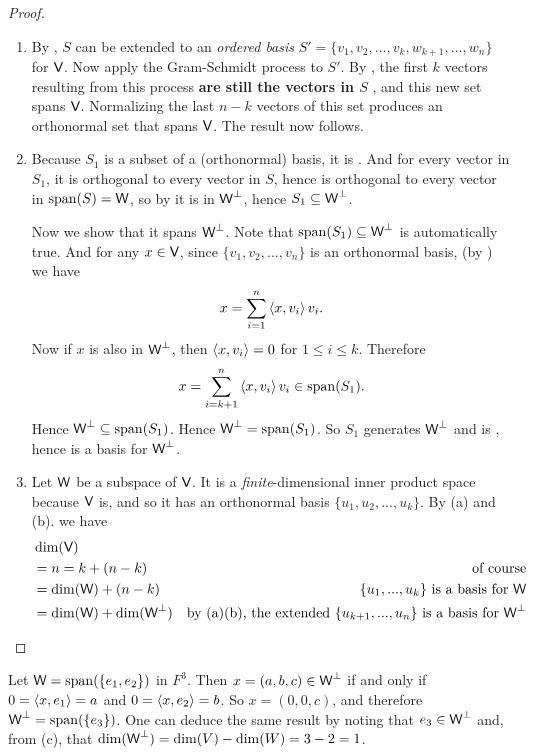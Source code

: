 \begin{proof} \ 

\begin{enumerate}
\item By , \(S\) can be extended to an \emph{ordered basis} \(S' = \{ v_1, v_2, ..., v_{k}, w_{k+1}, ..., w_n \}\) for \(\textsf{V}\).
Now apply the Gram-Schmidt process to \(S'\).
By , the first \(k\) vectors resulting from this process \textbf{are still the vectors in \(S\)} , and this new set spans \(\textsf{V}\).
Normalizing the last \(n - k\) vectors of this set produces an orthonormal set that spans \(\textsf{V}\).
The result now follows.

\item Because \(S_1\) is a subset of a (orthonormal) basis, it is \LID{}.
And for every vector in \(S_1\), it is orthogonal to every vector in \(S\), hence is orthogonal to every vector in \(\operatorname{span}(S) = \textsf{W}\), so by  it is in \(\textsf{W}^{\perp}\), hence \(S_1 \subseteq \textsf{W}^{\perp}\).

Now we show that it spans \(\textsf{W}^{\perp}\).
Note that \(\operatorname{span}(S_1) \subseteq \textsf{W}^{\perp}\) is automatically true.
And for any \(x \in \textsf{V}\), since \(\{ v_1, v_2, ..., v_n \}\) is an orthonormal basis, (by ) we have
\[
    x = \sum_{i = 1}^n \left< x, v_i \right> v_i.
\]
Now if \(x\) is also in \(\textsf{W}^{\perp}\), then \(\left< x, v_i \right> = 0\) for \(1 \le i \le k\).
Therefore
\[
    x = \sum_{i = k + 1}^n \left< x, v_i \right> v_i \in \operatorname{span}(S_1).
\]
Hence \(\textsf{W}^{\perp} \subseteq \operatorname{span}(S_1)\).
Hence \(\textsf{W}^{\perp} = \operatorname{span}(S_1)\).
So \(S_1\) generates \(\textsf{W}^{\perp}\) and is \LID{}, hence is a basis for \(\textsf{W}^{\perp}\).

\item Let \(\textsf{W}\) be a subspace of \(\textsf{V}\).
It is a \emph{finite}-dimensional inner product space because \(\textsf{V}\) is, and so it has an orthonormal basis \(\{ u_1, u_2, ..., u_k \}\).
By (a) and (b). we have
\begin{align*}
    & \dim(\textsf{V}) \\
    & = n = k + (n - k) & \text{of course} \\
    & = \dim(\textsf{W}) + (n - k) & \text{\(\{ u_1, ..., u_k \}\) is a basis for \(\textsf{W}\)} \\
    & = \dim(\textsf{W}) + \dim(\textsf{W}^{\perp}) & \text{by (a)(b), the extended \(\{ u_{k + 1}, ..., u_{n} \}\) is a basis for \(\textsf{W}^{\perp}\)}
\end{align*}
\end{enumerate}
\end{proof}

\begin{example} \label{example 6.2.11}
Let \(\textsf{W} = \operatorname{span}(\{ e_1, e_2 \})\) in \(F^3\).
Then \(x = (a, b, c) \in \textsf{W}^{\perp}\) if and only if \(0 = \left< x, e_1 \right> = a\) and \(0 = \left< x , e_2 \right> = b\).
So \(x = (0, 0, c)\), and therefore \(\textsf{W}^{\perp} = \operatorname{span}(\{ e_3 \})\).
One can deduce the same result by noting that \(e_3 \in \textsf{W}^{\perp}\) and, from (c), that \(\dim(\textsf{W}^{\perp}) = \dim(V) - \dim(W) = 3 - 2 = 1\).
\end{example}
